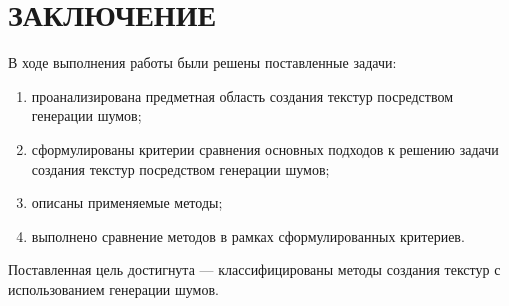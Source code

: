 \chapter*{ЗАКЛЮЧЕНИЕ}

В ходе выполнения работы были решены поставленные задачи:
\begin{enumerate}
	\item проанализирована предметная область создания текстур посредством генерации шумов;
	\item сформулированы критерии сравнения основных подходов к решению задачи создания текстур посредством генерации шумов;
	\item описаны применяемые методы;
	\item выполнено сравнение методов в рамках сформулированных критериев.
\end{enumerate}

Поставленная цель достигнута --- классифицированы методы создания текстур с использованием генерации шумов.